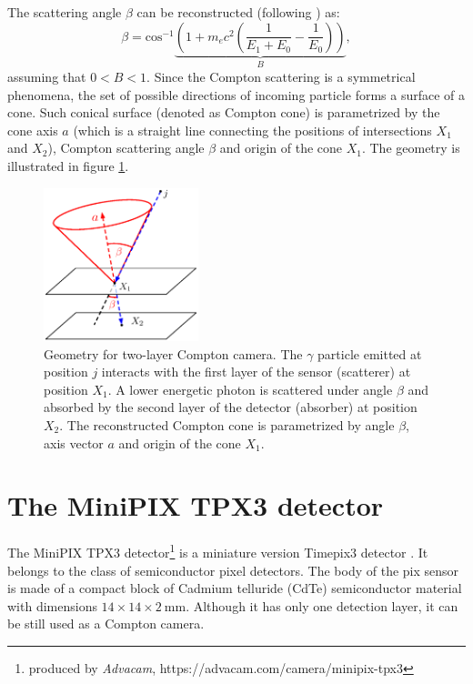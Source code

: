 The scattering angle $\beta$ can be reconstructed (following \cite{baca2021gamma}) as:
\begin{equation}
  \beta = \mathrm{cos}^{-1} 
  \underset{B}{\underbrace{
  \left ( 1+m_{e}c^{2} \left( \frac{1}{E_{1}+E_{0}} - \frac{1}{E_{0}}\right )  \right )
  }},
    \label{eq:compton_beta_formula}
\end{equation}
assuming that $0<B<1$.
Since the Compton scattering is a symmetrical phenomena,  the set of possible directions of incoming particle forms a surface of a cone.
Such conical surface (denoted as Compton cone) is parametrized by the cone axis $a$ (which is a straight line connecting the positions of intersections $X_{1}$ and $X_{2}$), Compton scattering angle $\beta$ and origin of the cone $X_{1}$.
The geometry is illustrated in figure \ref{fig:compton_camera_geometry}.

  \begin{figure}[!h]
    \centering
      \includegraphics[width=0.4\textwidth]{./fig/photos/compton_camera_modelll.eps}
      \caption{Geometry for two-layer Compton camera. The $\gamma$ particle emitted at position $j$ interacts with the first layer of the sensor (scatterer) at position $X_{1}$. A lower energetic photon is scattered under angle $\beta$ and absorbed by the second layer of the detector (absorber) at position $X_{2}$. The reconstructed Compton cone is parametrized by angle $\beta$, axis vector $a$ and origin of the cone $X_{1}$.}
      \label{fig:compton_camera_geometry}
  \end{figure}



\section{The MiniPIX TPX3 detector} 
The MiniPIX TPX3 detector\footnote{produced by \textit{Advacam}, https://advacam.com/camera/minipix-tpx3} is a miniature version Timepix3 detector \cite{timepix3}.
It belongs to the class of semiconductor pixel detectors.
The body of the \ac{pix} sensor is made of a compact block of Cadmium telluride (CdTe) semiconductor material with dimensions $14 \times 14 \times 2 \ \si{\milli\meter}$.
Although it has only one detection layer, it can be still used as a Compton camera.

